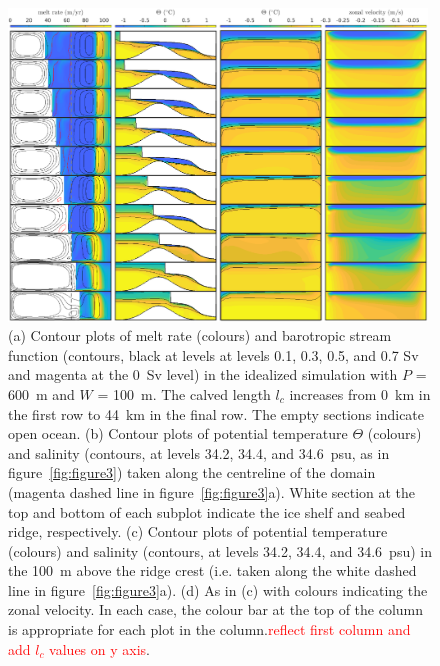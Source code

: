 \documentclass[draft]{agujournal2019}
\newcommand{\red}[1]{\textcolor{red}{#1}}
\begin{document}
\begin{figure}
    \centering
    \includegraphics[width = 0.99\textwidth]{../make_figures/plots/figure5.eps}
    \caption{(a) Contour plots of melt rate (colours) and barotropic stream function (contours, black at levels  at levels 0.1, 0.3, 0.5, and 0.7 Sv and magenta at the 0~Sv level) in the idealized simulation with $P$ = 600~m and $W$ = 100~m. The calved length $l_c$ increases from 0~km in the first row to 44~km in the final row. The empty sections indicate open ocean. (b) Contour plots of potential temperature $\Theta$ (colours) and salinity (contours, at levels 34.2, 34.4, and 34.6~psu, as in figure~\ref{fig:figure3}) taken along the centreline of the domain (magenta dashed line in figure~\ref{fig:figure3}a). White section at the top and bottom of each subplot indicate the ice shelf and seabed ridge, respectively. (c) Contour plots of potential temperature (colours) and salinity (contours, at levels 34.2, 34.4, and 34.6~psu) in the 100~m above the ridge crest (i.e. taken along the white dashed line in figure~\ref{fig:figure3}a). (d) As in (c) with colours indicating the zonal velocity.  In each case, the colour bar at the top of the column is appropriate for each plot in the column.\red{reflect first column and add $l_c$ values on y axis}.}
    \label{fig:figure5}
\end{figure}
\end{document}
